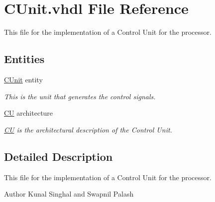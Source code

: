 \hypertarget{_c_unit_8vhdl}{\section{C\-Unit.\-vhdl File Reference}
\label{_c_unit_8vhdl}
}


This file for the implementation of a Control Unit for the processor.  


\subsection*{Entities}
\begin{DoxyCompactItemize}
\item 
\hyperlink{class_c_unit}{C\-Unit} entity
\begin{DoxyCompactList}\small\item\em This is the unit that generates the control signals. \end{DoxyCompactList}\item 
\hyperlink{class_c_unit_1_1_c_u}{C\-U} architecture
\begin{DoxyCompactList}\small\item\em \hyperlink{class_c_unit_1_1_c_u}{C\-U} is the architectural description of the Control Unit. \end{DoxyCompactList}\end{DoxyCompactItemize}


\subsection{Detailed Description}
This file for the implementation of a Control Unit for the processor. \begin{DoxyAuthor}{Author}
Kunal Singhal and Swapnil Palash 
\end{DoxyAuthor}
